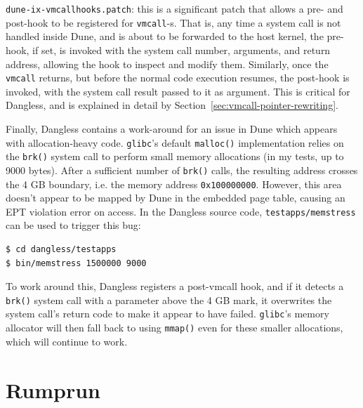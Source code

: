 \texttt{dune-ix-vmcallhooks.patch}: this is a significant patch that allows a pre- and post-hook to be registered for \lstinline!vmcall!-s. That is, any time a system call is not handled inside Dune, and is about to be forwarded to the host kernel, the pre-hook, if set, is invoked with the system call number, arguments, and return address, allowing the hook to inspect and modify them. Similarly, once the \lstinline!vmcall! returns, but before the normal code execution resumes, the post-hook is invoked, with the system call result passed to it as argument. This is critical for Dangless, and is explained in detail by Section~\ref{sec:vmcall-pointer-rewriting}.

Finally, Dangless contains a work-around for an issue in Dune which appears with allocation-heavy code. \texttt{glibc}'s default \lstinline!malloc()! implementation relies on the \lstinline!brk()! system call to perform small memory allocations (in my tests, up to 9000 bytes). After a sufficient number of \lstinline!brk()! calls, the resulting address crosses the 4 GB boundary, i.e. the memory address \texttt{0x100000000}. However, this area doesn't appear to be mapped by Dune in the embedded page table, causing an EPT violation error on access. In the Dangless source code, \texttt{testapps/memstress} can be used to trigger this bug:

\begin{verbatim}
$ cd dangless/testapps
$ bin/memstress 1500000 9000
\end{verbatim}

To work around this, Dangless registers a post-vmcall hook, and if it detects a \lstinline!brk()! system call with a parameter above the 4 GB mark, it overwrites the system call's return code to make it appear to have failed. \texttt{glibc}'s memory allocator will then fall back to using \lstinline!mmap()! even for these smaller allocations, which will continue to work.



\section{Rumprun}

